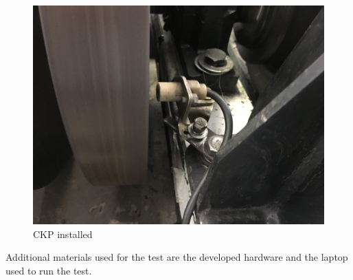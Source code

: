 		\begin{figure}[htbp]
			\centering
			\includegraphics[scale=0.05]{figuras/fig-ckp-installed}
			\caption{CKP installed}
			\label{fig:ckp-installed}
		\end{figure}
		\par

		Additional materials used for the test are the developed hardware and the laptop used to run the test.